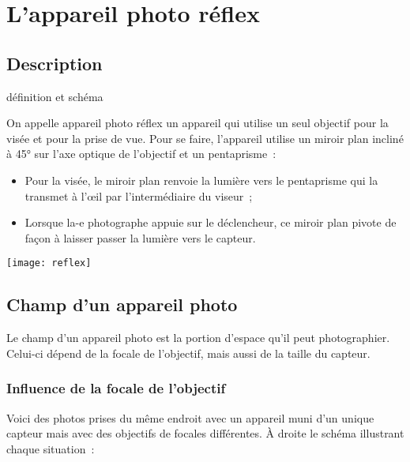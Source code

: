 \documentclass[../main/main.tex]{subfiles}
\begin{document}
\section{L'appareil photo réflex}

\subsection{Description}

\begin{defi}[label=def:reflex, %
    righthand width=.7\linewidth]{définition et schéma}
    
On appelle appareil photo réflex un appareil qui utilise un seul objectif pour
la visée et pour la prise de vue. Pour se faire, l'appareil utilise un miroir
plan incliné à \ang{45;;} sur l'axe optique de l'objectif et un pentaprisme~:

\begin{itemize}
    \item Pour la visée, le miroir plan renvoie la lumière vers le pentaprisme
        qui la transmet à l'œil par l'intermédiaire du viseur~;
    \item Lorsque la-e photographe appuie sur le déclencheur, ce miroir plan
        pivote de façon à laisser passer la lumière vers le capteur.
\end{itemize}
\tcblower
\begin{center}
	\texttt{[image: reflex]}
\end{center}
\end{defi}

\subsection{Champ d'un appareil photo}

Le champ d'un appareil photo est la portion d'espace qu'il peut photographier.
Celui-ci dépend de la focale de l'objectif, mais aussi de la taille du capteur.

\subsubsection{Influence de la focale de l'objectif}

Voici des photos prises du même endroit avec un appareil muni d'un unique
capteur mais avec des objectifs de focales différentes. À droite le schéma
illustrant chaque situation~:\newline
\end{document}
